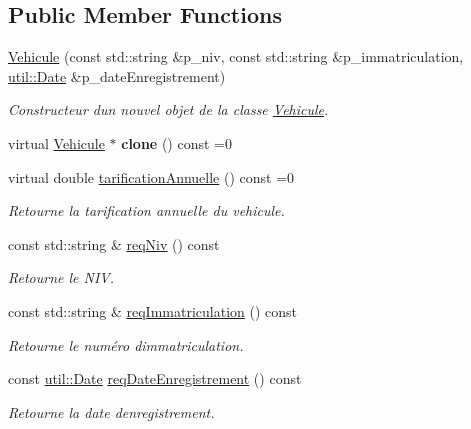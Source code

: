 \subsection*{Public Member Functions}
\begin{DoxyCompactItemize}
\item 
\hyperlink{classsaaq_1_1Vehicule_a20f052188538616a6f54ee1061398319}{Vehicule} (const std\+::string \&p\+\_\+niv, const std\+::string \&p\+\_\+immatriculation, \hyperlink{classutil_1_1Date}{util\+::\+Date} \&p\+\_\+date\+Enregistrement)
\begin{DoxyCompactList}\small\item\em Constructeur d\textquotesingle{}un nouvel objet de la classe \hyperlink{classsaaq_1_1Vehicule}{Vehicule}. \end{DoxyCompactList}\item 
\mbox{\label{classsaaq_1_1Vehicule_a24e65619f882d26dd3f2bfee25a7b3e6}} 
virtual \hyperlink{classsaaq_1_1Vehicule}{Vehicule} $\ast$ {\bfseries clone} () const =0
\item 
virtual double \hyperlink{classsaaq_1_1Vehicule_a93570921069d25b6bc48cf04af176395}{tarification\+Annuelle} () const =0
\begin{DoxyCompactList}\small\item\em Retourne la tarification annuelle du vehicule. \end{DoxyCompactList}\item 
const std\+::string \& \hyperlink{classsaaq_1_1Vehicule_a8a7c31860afb58614a44ba89a9ddc224}{req\+Niv} () const
\begin{DoxyCompactList}\small\item\em Retourne le N\+IV. \end{DoxyCompactList}\item 
const std\+::string \& \hyperlink{classsaaq_1_1Vehicule_a2e8df437d34cc3b3e5008d5a5a819aae}{req\+Immatriculation} () const
\begin{DoxyCompactList}\small\item\em Retourne le numéro d\textquotesingle{}immatriculation. \end{DoxyCompactList}\item 
const \hyperlink{classutil_1_1Date}{util\+::\+Date} \hyperlink{classsaaq_1_1Vehicule_a650c5f764375e344e268391a5c3cf8b3}{req\+Date\+Enregistrement} () const
\begin{DoxyCompactList}\small\item\em Retourne la date d\textquotesingle{}enregistrement. \end{DoxyCompactList}\item 

\end{DoxyCompactItemize}
